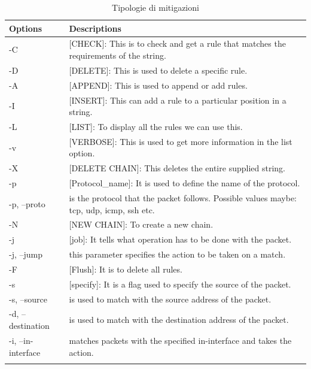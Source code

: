 \begin{center} 
\begin{longtable}{|p{}|p{}|} 
    \hline 
    \textbf{Options} & \textbf{Descriptions} \\
    \hline 
    -C	& [CHECK]: This is to check and get a rule that matches the requirements of the string. \\
    \hline 
    -D	& [DELETE]: This is used to delete a specific rule. \\
    \hline 
    -A	& [APPEND]: This is used to append or add rules. \\
    \hline 
    -I	& [INSERT]: This can add a rule to a particular position in a string. \\
    \hline 
    -L	& [LIST]: To display all the rules we can use this. \\
    \hline 
    -v	& [VERBOSE]: This is used to get more information in the list option. \\
    \hline 
    -X	& [DELETE CHAIN]: This deletes the entire supplied string. \\
    \hline 
    -p	& [Protocol\_name]: It is used to define the name of the protocol. \\
    -p, --proto & is the protocol that the packet follows. Possible values maybe: tcp, udp, icmp, ssh etc. \\
    \hline 
    -N	& [NEW CHAIN]: To create a new chain. \\
    \hline 
    -j	& [job]: It tells what operation has to be done with the packet. \\ 
    -j, --jump & this parameter specifies the action to be taken on a match. \\
    \hline 
    -F	& [Flush]: It is to delete all rules. \\
    \hline 
    -s	& [specify]: It is a flag used to specify the source of the packet.  \\ 
    -s, --source & is used to match with the source address of the packet. \\ 
    -d, --destination & is used to match with the destination address of the packet.\\
    -i, --in-interface & matches packets with the specified in-interface and takes the action. \\
    \hline 
\caption{Tipologie di mitigazioni} 
\label{tabella:mitigazioni:tipologie} 
\end{longtable} 
\end{center} 



